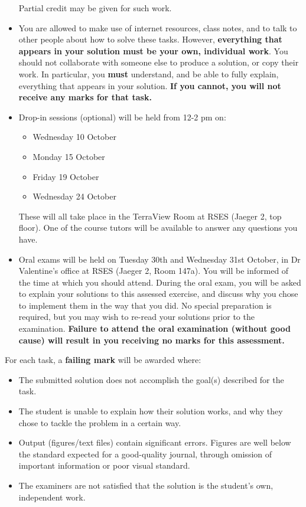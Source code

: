 \documentclass[11pt]{article}
\providecommand{\tightlist}{%
      \setlength{\itemsep}{0pt}\setlength{\parskip}{0pt}}
\begin{document}
\begin{itemize}
  Partial credit may be given for such work.
\item
  You are allowed to make use of internet resources, class notes, and to
  talk to other people about how to solve these tasks. However,
  \textbf{everything that appears in your solution must be your own,
  individual work}. You should not collaborate with someone else to
  produce a solution, or copy their work. In particular, you
  \textbf{must} understand, and be able to fully explain, everything
  that appears in your solution. \textbf{If you cannot, you will not
  receive any marks for that task.}
\item
  Drop-in sessions (optional) will be held from 12-2 pm on:

  \begin{itemize}
  \tightlist
  \item
    Wednesday 10 October
  \item
    Monday 15 October
  \item
    Friday 19 October
  \item
    Wednesday 24 October
  \end{itemize}

  These will all take place in the TerraView Room at RSES (Jaeger 2, top
  floor). One of the course tutors will be available to answer any
  questions you have.
\item
  Oral exams will be held on Tuesday 30th and Wednesday 31st October, in
  Dr Valentine's office at RSES (Jaeger 2, Room 147a). You will be
  informed of the time at which you should attend. During the oral exam,
  you will be asked to explain your solutions to this assessed exercise,
  and discuss why you chose to implement them in the way that you did.
  No special preparation is required, but you may wish to re-read your
  solutions prior to the examination. \textbf{Failure to attend the oral
  examination (without good cause) will result in you receiving no marks
  for this assessment.}
\end{itemize}

For each task, a \textbf{failing mark} will be awarded where:

\begin{itemize}
\item
  The submitted solution does not accomplish the goal(s) described for
  the task.
\item
  The student is unable to explain how their solution works, and why
  they chose to tackle the problem in a certain way.
\item
  Output (figures/text files) contain significant errors. Figures are
  well below the standard expected for a good-quality journal, through
  omission of important information or poor visual standard.
\item
  The examiners are not satisfied that the solution is the student's
  own, independent work.
\end{itemize}
\end{document}
